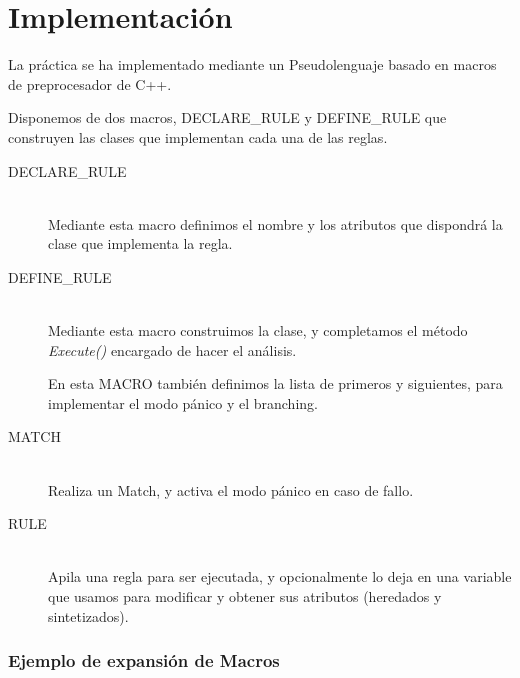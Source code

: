 \chapter{Implementación}


	La práctica se ha implementado mediante un Pseudolenguaje basado en macros de preprocesador de C++.
	
	Disponemos de dos macros, DECLARE\_RULE y DEFINE\_RULE que construyen las clases que implementan cada una de las reglas.
	
	\begin{description}
	
		\item[DECLARE\_RULE] ~ \\
			Mediante esta macro definimos el nombre y los atributos que dispondrá la clase que implementa la regla.
			
		\item[DEFINE\_RULE] ~\\
			Mediante esta macro construimos la clase, y completamos el método \emph{Execute()} encargado de hacer el análisis.
			
			En esta MACRO también definimos la lista de primeros y siguientes, para implementar el modo pánico y el branching.
			
		\item[MATCH] ~\\
			Realiza un Match, y activa el modo pánico en caso de fallo.
			
		\item[RULE] ~\\
			Apila una regla para ser ejecutada, y opcionalmente lo deja en una variable que usamos para modificar y obtener sus atributos (heredados y sintetizados).
			
			
	\end{description}
	
	
	\subsection{Ejemplo de expansión de Macros}
	
		